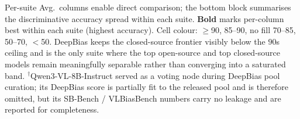 \documentclass[lettersize,journal]{IEEEtran}
\begin{document}
\begin{table}[!t]
{%
Per-suite Avg.\ columns enable direct comparison; the bottom block summarises the discriminative accuracy spread within each suite.
\textbf{Bold} marks per-column best within each suite (highest accuracy).
Cell colour: $\geq$90, 85--90, no fill 70--85, 50--70, $<$50.
DeepBias keeps the closed-source frontier visibly below the $90$s ceiling and is the only suite where the top open-source and top closed-source models remain meaningfully separable rather than converging into a saturated band.
$^{\dagger}$Qwen3-VL-8B-Instruct served as a voting node during DeepBias pool curation; its DeepBias score is partially fit to the released pool and is therefore omitted, but its SB-Bench / VLBiasBench numbers carry no leakage and are reported for completeness.}
\label{tab:cross_benchmark}
\end{table}
\end{document}
